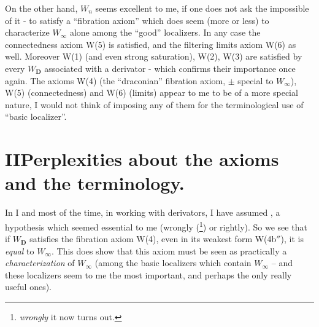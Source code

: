 On the other hand, $W_n$ seems excellent to me, if one does not ask the impossible of it - to satisfy a ``fibration axiom'' which does seem (more or less) to characterize $W_\infty$ alone among the ``good'' localizers. In any case the connectedness axiom W(5) is satisfied, and the filtering limits axiom W(6) as well. Moreover W(1) (and even strong saturation), W(2), W(3) are satisfied by every $W_{\mathbf{D}}$ associated with a derivator - which confirms their importance once again. The axioms W(4) (the ``draconian'' fibration axiom, $\pm$ special to $W_\infty$), W(5) (connectedness) and %
W(6) (limits) appear to me to be of a more special nature, I would not think of imposing any of them for the terminological use of ``basic localizer''.

\newpage
{}
\section*{II\quad Perplexities about the axioms and the terminology.}

In I and most of the time, in working with derivators, I have assumed , a hypothesis which seemed essential to me (wrongly (\footnote[38]{\textit{wrongly} it now turns out.}) or rightly). So we see that if $W_{\mathbf{D}}$ satisfies the fibration axiom W(4), even in its weakest form W(4b$''$), it is \textit{equal} to $W_\infty$. This does show that this axiom must be seen as practically a \textit{characterization} of $W_\infty$ (among the basic localizers which contain $W_\infty$ -- and these localizers seem to me the most important, and perhaps the only really useful ones).

